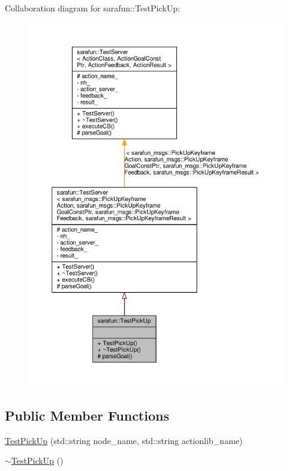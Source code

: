 Collaboration diagram for sarafun\-:\-:Test\-Pick\-Up\-:
\nopagebreak
\begin{figure}[H]
\begin{center}
\leavevmode
\includegraphics[width=350pt]{db/dcf/classsarafun_1_1TestPickUp__coll__graph}
\end{center}
\end{figure}
\subsection*{Public Member Functions}
\begin{DoxyCompactItemize}
\item 
\hyperlink{classsarafun_1_1TestPickUp_a2d06467282615b0dc55e7d5e0602abf1_a2d06467282615b0dc55e7d5e0602abf1}{Test\-Pick\-Up} (std\-::string node\-\_\-name, std\-::string actionlib\-\_\-name)
\item 
\hyperlink{classsarafun_1_1TestPickUp_a4f2b56a24cc26f1224920e0e9aba67c3_a4f2b56a24cc26f1224920e0e9aba67c3}{$\sim$\-Test\-Pick\-Up} ()
\end{DoxyCompactItemize}
